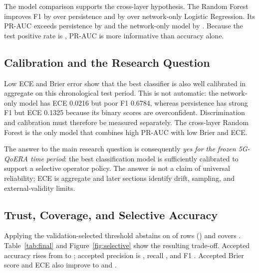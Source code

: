 \documentclass[10pt,conference]{IEEEtran}
\begin{document}
The model comparison supports the cross-layer hypothesis.  The Random Forest
improves F1 by \FoneVsPersistence over persistence and by \FoneVsNetwork over network-only Logistic
Regression.  Its PR-AUC exceeds persistence by \PRAUCVsPersistence and the network-only
model by \PRAUCVsNetwork.  Because the test positive rate is \TestPoorRate, PR-AUC is
more informative than accuracy alone.

\subsection{Calibration and the Research Question}

Low ECE and Brier error show that the best classifier is also well calibrated
in aggregate on this chronological test period.  This is not automatic: the
network-only model has ECE 0.0216 but poor F1 0.6784, whereas persistence has
strong F1 but ECE 0.1325 because its binary scores are overconfident.
Discrimination and calibration must therefore be measured separately.  The
cross-layer Random Forest is the only model that combines high PR-AUC with low
Brier and ECE.

The answer to the main research question is consequently \emph{yes for the
frozen 5G-QoERA time period}: the best classification model is sufficiently
calibrated to support a selective operator policy.  The answer is not a claim
of universal reliability; ECE is aggregate and later sections identify drift,
sampling, and external-validity limits.

\subsection{Trust, Coverage, and Selective Accuracy}

Applying the validation-selected threshold abstains on \AbstainedCount of
\TestRows rows (\AbstentionRate) and covers \Coverage.  Table~\ref{tab:final}
and Figure~\ref{fig:selective} show the resulting trade-off.  Accepted accuracy
rises from \RFAccuracy to \AcceptedAccuracy; accepted precision is
\AcceptedPrecision, recall \AcceptedRecall, and F1 \AcceptedFone.  Accepted
Brier score and ECE also improve to \AcceptedBrier and \AcceptedECE.

\begin{table}[t]
\caption{Overall versus accepted test decisions}
\label{tab:final}
\centering
\resizebox{\columnwidth}{!}{}
\end{table}
\end{document}
